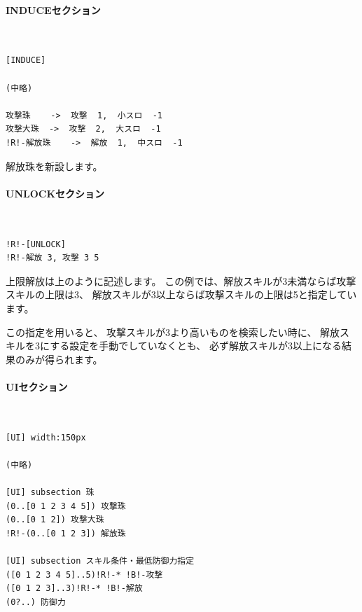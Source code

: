 \documentclass[dvipdfmx]{jsarticle}
\begin{document}
\paragraph{INDUCEセクション}~\medskip
{\footnotesize\begin{mdframed}\begin{Verbatim}[commandchars=!<>]
[INDUCE]

(中略)

攻撃珠    ->  攻撃  1,  小スロ  -1
攻撃大珠  ->  攻撃  2,  大スロ  -1
!R!-解放珠    ->  解放  1,  中スロ  -1
\end{Verbatim}
\end{mdframed}}
\medskip

解放珠を新設します。

\paragraph{UNLOCKセクション}~\medskip
{\footnotesize\begin{mdframed}\begin{Verbatim}[commandchars=!<>]
!R!-[UNLOCK]
!R!-解放 3, 攻撃 3 5
\end{Verbatim}
\end{mdframed}}
\medskip

上限解放は上のように記述します。
この例では、解放スキルが3未満ならば攻撃スキルの上限は3、
解放スキルが3以上ならば攻撃スキルの上限は5と指定しています。

この指定を用いると、
攻撃スキルが3より高いものを検索したい時に、
解放スキルを3にする設定を手動でしていなくとも、
必ず解放スキルが3以上になる結果のみが得られます。




\paragraph{UIセクション}~\medskip
{\footnotesize\begin{mdframed}\begin{Verbatim}[commandchars=!<>]
[UI] width:150px

(中略)

[UI] subsection 珠
(0..[0 1 2 3 4 5]) 攻撃珠
(0..[0 1 2]) 攻撃大珠
!R!-(0..[0 1 2 3]) 解放珠

[UI] subsection スキル条件・最低防御力指定
([0 1 2 3 4 5]..5)!R!-* !B!-攻撃
([0 1 2 3]..3)!R!-* !B!-解放
(0?..) 防御力
\end{Verbatim}
\end{mdframed}}
\medskip
\end{document}
